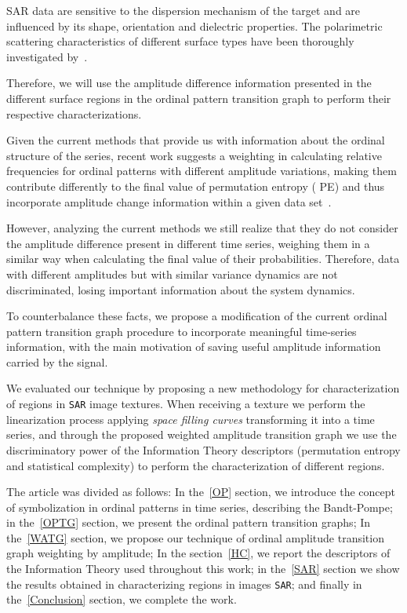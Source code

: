 \documentclass{isprs}
\begin{document}
SAR data are sensitive to the dispersion mechanism of the target and are influenced by its shape, orientation and dielectric properties.
The polarimetric scattering characteristics of different surface types have been thoroughly investigated by~\cite{Moriyama2004study, Fujita2004Polarimetric}.

Therefore, we will use the amplitude difference information presented in the different surface regions in the ordinal pattern transition graph to perform their respective characterizations.
	
Given the current methods that provide us with information about the ordinal structure of the series, recent work suggests a weighting in calculating relative frequencies for ordinal patterns with different amplitude variations, making them contribute differently to the final value of permutation entropy ( PE) and thus incorporate amplitude change information within a given data set~\citep{Fadlallah2013Weightedpermutation}.
	
However, analyzing the current methods we still realize that they do not consider the amplitude difference present in different time series, weighing them in a similar way when calculating the final value of their probabilities.
Therefore, data with different amplitudes but with similar variance dynamics are not discriminated, losing important information about the system dynamics.
	
To counterbalance these facts, we propose a modification of the current ordinal pattern transition graph procedure to incorporate meaningful time-series information, with the main motivation of saving useful amplitude information carried by the signal.
	
We evaluated our technique by proposing a new methodology for characterization of regions in \texttt{SAR} image textures.
When receiving a texture we perform the linearization process applying \textit{space filling curves} transforming it into a time series, and through the proposed weighted amplitude transition graph we use the discriminatory power of the Information Theory descriptors (permutation entropy and statistical complexity) to perform the characterization of different regions.
	
The article was divided as follows:
In the~\ref{OP} section, we introduce the concept of symbolization in ordinal patterns in time series, describing the Bandt-Pompe;
in the~\ref{OPTG} section, we present the ordinal pattern transition graphs;
In the~\ref{WATG} section, we propose our technique of ordinal amplitude transition graph weighting by amplitude;
In the section~\ref{HC}, we report the descriptors of the Information Theory used throughout this work;
in the~\ref{SAR} section we show the results obtained in characterizing regions in images \texttt{SAR};
and finally in the~\ref{Conclusion} section, we complete the work.
	
\end{document}
